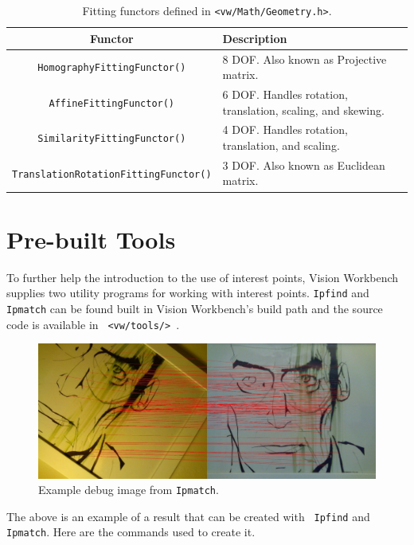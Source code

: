 \begin{table}[h]\begin{centering}
\begin{tabular}{|c|l|} \hline
Functor & Description \\ \hline \hline
\verb#HomographyFittingFunctor()# & 8 DOF. Also known as Projective matrix. \\ \hline
\verb#AffineFittingFunctor()# & 6 DOF. Handles rotation, translation, scaling, and skewing. \\ \hline
\verb#SimilarityFittingFunctor()# & 4 DOF. Handles rotation, translation, and scaling. \\ \hline
\verb#TranslationRotationFittingFunctor()# & 3 DOF. Also known as Euclidean matrix. \\ \hline
\end{tabular}
\caption{Fitting functors defined in {\tt <vw/Math/Geometry.h>}.}
\label{tbl:fitting-functors}
\end{centering}\end{table}

\section{Pre-built Tools}

To further help the introduction to the use of interest points,
Vision Workbench supplies two utility programs for working with interest
points. {\tt Ipfind} and {\tt Ipmatch} can be found built in
Vision Workbench's build path and the source code is available in {\tt
  <vw/tools/> }.

\begin{figure}[h]
\begin{center}
  \includegraphics[width=6in]{images/ip_demo_match.jpg}
\end{center}
\caption{Example debug image from {\tt Ipmatch}.}
\label{fig:demo}
\end{figure}

The above is an example of a result that can be created with {\tt
  Ipfind} and {\tt Ipmatch}. Here are the commands used to create it.

